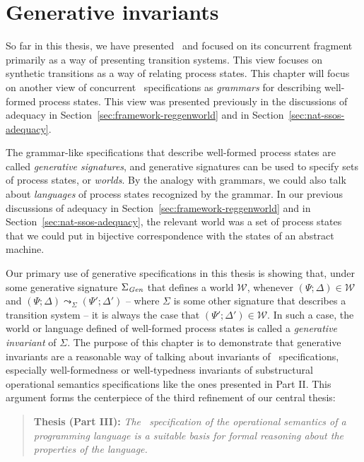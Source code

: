 \chapter{Generative invariants}
\label{chapter-gen}

So far in this thesis, we have presented \sls~and focused on its
concurrent fragment primarily as a way of presenting transition
systems. This view focuses on synthetic transitions as a way of
relating process states. This chapter will focus on another view of
concurrent \sls~specifications as {\it grammars} for describing
well-formed process states. This view was presented previously in the
discussions of adequacy in Section~\ref{sec:framework-reggenworld} and
in Section~\ref{sec:nat-ssos-adequacy}.

The grammar-like specifications that describe well-formed process
states are called {\it generative signatures}, and generative
signatures can be used to specify sets of process states, or {\it
  worlds}. By the analogy with grammars, we could also talk about
{\it languages} of process states recognized by the grammar. In our
previous discussions of adequacy in
Section~\ref{sec:framework-reggenworld} and in
Section~\ref{sec:nat-ssos-adequacy}, the relevant world was a set of
process states that we could put in bijective correspondence with the
states of an abstract machine.  

Our primary use of generative specifications in this thesis is showing
that, under some generative signature $\Sigma_{\it Gen}$ that defines
a world $\mathcal W$, whenever $(\Psi; \Delta) \in \mathcal W$ and
$(\Psi; \Delta) \leadsto_\Sigma (\Psi'; \Delta')$ -- where $\Sigma$ is
some other signature that describes a transition system -- it is
always the case that $(\Psi'; \Delta') \in \mathcal W$. In such a
case, the world or language defined of well-formed process states is
called a {\it generative invariant} of $\Sigma$.  The purpose of this
chapter is to demonstrate that generative invariants are a reasonable
way of talking about invariants of \sls~specifications, especially
well-formedness or well-typedness invariants of substructural
operational semantics specifications like the ones presented in Part
II. This argument forms the centerpiece of the third refinement of our
central thesis:

\smallskip
\begin{quote} 
  {\bf Thesis (Part III):} {\it The \sls~specification of the operational
    semantics of a programming language is a suitable basis for formal
    reasoning about the properties of the language.}
\end{quote} 
\smallskip 

